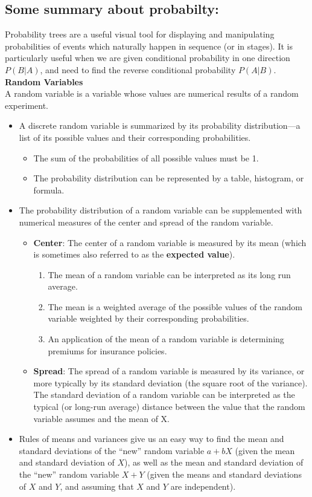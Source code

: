 \documentclass[10pt, a4paper]{article}
\begin{document}
\subsection{Some summary about probabilty:}
Probability trees are a useful visual tool for displaying and manipulating probabilities of events which naturally happen in sequence (or in stages). It is particularly useful when we are given conditional probability in one direction $P(B | A)$, and need to find the reverse conditional probability $P(A | B)$.\\
\textbf{Random Variables}\\
A random variable is a variable whose values are numerical results of a random experiment.
\begin{itemize}
\item A discrete random variable is summarized by its probability distribution—a list of its possible values and their corresponding probabilities.
  \begin{itemize}
    \item The sum of the probabilities of all possible values must be 1.
    \item The probability distribution can be represented by a table, histogram, or formula.
  \end{itemize}
\item The probability distribution of a random variable can be supplemented with numerical measures of the center and spread of the random variable.
  \begin{itemize}
    \item \textbf{Center}: The center of a random variable is measured by its mean (which is sometimes also referred to as the \textbf{expected value}).
      \begin{enumerate}
      \item The mean of a random variable can be interpreted as its long run average.
      \item The mean is a weighted average of the possible values of the random variable weighted by their corresponding probabilities.
      \item An application of the mean of a random variable is determining premiums for insurance policies.
      \end{enumerate}
    \item \textbf{Spread}: The spread of a random variable is measured by its variance, or more typically by its standard deviation (the square root of the variance).\\
        The standard deviation of a random variable can be interpreted as the typical (or long-run average) distance between the value that the random variable assumes and the mean of X.
\end{itemize}
\item Rules of means and variances give us an easy way to find the mean and standard deviations of the ``new'' random variable $a + bX$ (given the mean and standard deviation of $X$), as well as the mean and standard deviation of the ``new'' random variable $X + Y$ (given the means and standard deviations of $X$ and $Y$, and assuming that $X$ and $Y$ are independent).
\end{itemize}
\end{document}
